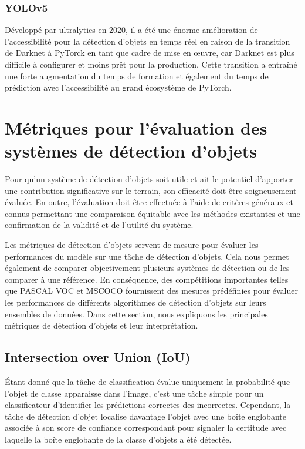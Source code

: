      \subsubsection{YOLOv5} 

Développé par ultralytics en 2020, il a été une énorme amélioration de l'accessibilité pour la détection d'objets en temps réel en raison de la transition de Darknet à PyTorck en tant que cadre de mise en œuvre, car Darknet est plus difficile à configurer et moins prêt pour la production. Cette transition a entraîné une forte augmentation du temps de formation et également du temps de prédiction avec l'accessibilité au grand écosystème de PyTorch.          
\section{Métriques pour l'évaluation des systèmes de détection d'objets} 
Pour qu'un système de détection d'objets soit utile et ait le potentiel d'apporter une contribution significative sur le terrain, son efficacité doit être soigneusement évaluée. En outre, l'évaluation doit être effectuée à l'aide de critères généraux et connus permettant une comparaison équitable avec les méthodes existantes et une confirmation de la validité et de l'utilité du système.

Les métriques de détection d'objets servent de mesure pour évaluer les performances du modèle sur une tâche de détection d'objets. Cela nous permet également de comparer objectivement plusieurs systèmes de détection ou de les comparer à une référence. En conséquence, des compétitions importantes telles que PASCAL VOC et MSCOCO fournissent des mesures prédéfinies pour évaluer les performances de différents algorithmes de détection d'objets sur leurs ensembles de données. Dans cette section, nous expliquons les principales métriques de détection d'objets et leur interprétation.
\subsection{Intersection over Union (IoU)}
Étant donné que la tâche de classification évalue uniquement la probabilité que l'objet de classe apparaisse dans l'image, c'est une tâche simple pour un classificateur d'identifier les prédictions correctes des incorrectes. Cependant, la tâche de détection d'objet localise davantage l'objet avec une boîte englobante associée à son score de confiance correspondant pour signaler la certitude avec laquelle la boîte englobante de la classe d'objets a été détectée.

